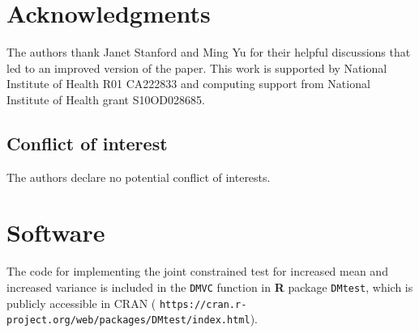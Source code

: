 \documentclass{statsoc}
\begin{document}

\section*{Acknowledgments}

The authors thank Janet Stanford and Ming Yu for their helpful discussions that led to an improved version of the paper. This work is supported by National Institute of Health R01 CA222833 and computing support from National Institute of Health grant S10OD028685.

\subsection*{Conflict of interest}

The authors declare no potential conflict of interests.

\section*{Software}
\label{sec5}

The code for implementing the joint constrained test for increased mean and increased variance is included in the \texttt{DMVC} function in {\bf R} package \texttt{DMtest}, which is publicly accessible in CRAN ( {\tt https://cran.r-project.org/web/packages/DMtest/index.html}).





\end{document}

